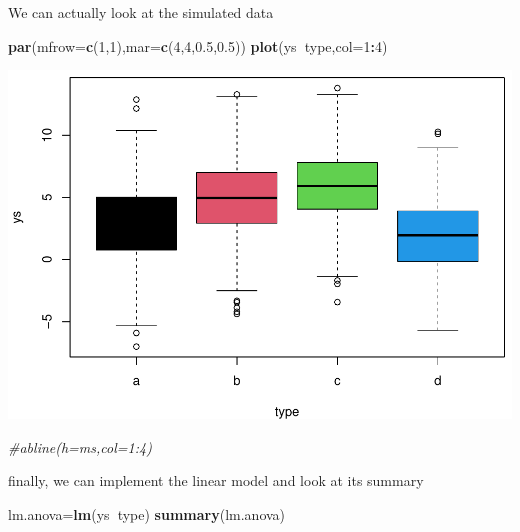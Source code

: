 \documentclass[
]{book}
\newenvironment{Shaded}{\begin{snugshade}}{\end{snugshade}}
\newcommand{\CommentTok}[1]{\textcolor[rgb]{0.56,0.35,0.01}{\textit{#1}}}
\newcommand{\DataTypeTok}[1]{\textcolor[rgb]{0.13,0.29,0.53}{#1}}
\newcommand{\DecValTok}[1]{\textcolor[rgb]{0.00,0.00,0.81}{#1}}
\newcommand{\FloatTok}[1]{\textcolor[rgb]{0.00,0.00,0.81}{#1}}
\newcommand{\KeywordTok}[1]{\textcolor[rgb]{0.13,0.29,0.53}{\textbf{#1}}}
\newcommand{\NormalTok}[1]{#1}
\newcommand{\OperatorTok}[1]{\textcolor[rgb]{0.81,0.36,0.00}{\textbf{#1}}}
\begin{document}
We can actually look at the simulated data

\begin{Shaded}
\begin{Highlighting}[]
\KeywordTok{par}\NormalTok{(}\DataTypeTok{mfrow=}\KeywordTok{c}\NormalTok{(}\DecValTok{1}\NormalTok{,}\DecValTok{1}\NormalTok{),}\DataTypeTok{mar=}\KeywordTok{c}\NormalTok{(}\DecValTok{4}\NormalTok{,}\DecValTok{4}\NormalTok{,}\FloatTok{0.5}\NormalTok{,}\FloatTok{0.5}\NormalTok{))}
\KeywordTok{plot}\NormalTok{(ys}\OperatorTok{~}\NormalTok{type,}\DataTypeTok{col=}\DecValTok{1}\OperatorTok{:}\DecValTok{4}\NormalTok{)}
\end{Highlighting}
\end{Shaded}

\includegraphics{ECOMODbook_files/figure-latex/a8.26-1.pdf}

\begin{Shaded}
\begin{Highlighting}[]
\CommentTok{#abline(h=ms,col=1:4)}
\end{Highlighting}
\end{Shaded}

finally, we can implement the linear model and look at its summary

\begin{Shaded}
\begin{Highlighting}[]
\NormalTok{lm.anova=}\KeywordTok{lm}\NormalTok{(ys}\OperatorTok{~}\NormalTok{type)}
\KeywordTok{summary}\NormalTok{(lm.anova)}
\end{Highlighting}
\end{Shaded}
\end{document}
